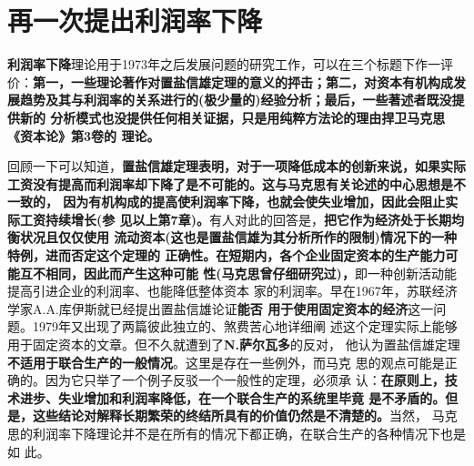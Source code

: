 \section{再一次提出利润率下降}

\textbf{利润率下降}理论用于1973年之后发展问题的研究工作，可以在三个标题下作一评
价：\textbf{第一，一些理论著作对置盐信雄定理的意义的抨击；第二，对资本有机构成发
  展趋势及其与利润率的关系进行的(极少量的)经验分析；最后，一些著述者既没提供新的
  分析模式也没提供任何相关证据，只是用纯粹方法论的理由捍卫马克思《资本论》第3卷的
  理论。}

回顾一下可以知道，\textbf{置盐信雄定理表明，对于一项降低成本的创新来说，如果实际
  工资没有提高而利润率却下降了是不可能的。这与马克思有关论述的中心思想是不一致的，
  因为有机构成的提高使利润率下降，也就会使失业增加，因此会阻止实际工资持续增长(参
  见以上第7章)。}有人对此的回答是，\textbf{把它作为经济处于长期均衡状况且仅仅使用
  流动资本(这也是置盐信雄为其分析所作的限制)情况下的一种特例，进而否定这个定理的
  正确性。在短期内，各个企业固定资本的生产能力可能互不相同，因此而产生这种可能
  性(马克思曾仔细研究过)，}即一种创新活动能提高引进企业的利润率、也能降低整体资本
家的利润率。早在1967年，苏联经济学家A.A.库伊斯就已经提出置盐信雄论证\textbf{能否
  用于使用固定资本的经济}这一问题。1979年又出现了两篇彼此独立的、煞费苦心地详细阐
述这个定理实际上能够用于固定资本的文章。但不久就遭到了\textbf{N.萨尔瓦多}的反对，
他认为置盐信雄定理\textbf{不适用于联合生产的一般情况}。这里是存在一些例外，而马克
思的观点可能是正确的。因为它只举了一个例子反驳一个一般性的定理，必须承
认：\textbf{在原则上，技术进步、失业增加和利润率降低，在一个联合生产的系统里毕竟
  是不矛盾的。但是，这些结论对解释长期繁荣的终结所具有的价值仍然是不清楚的。}当然，
马克思的利润率下降理论并不是在所有的情况下都正确，在联合生产的各种情况下也是如
此。

